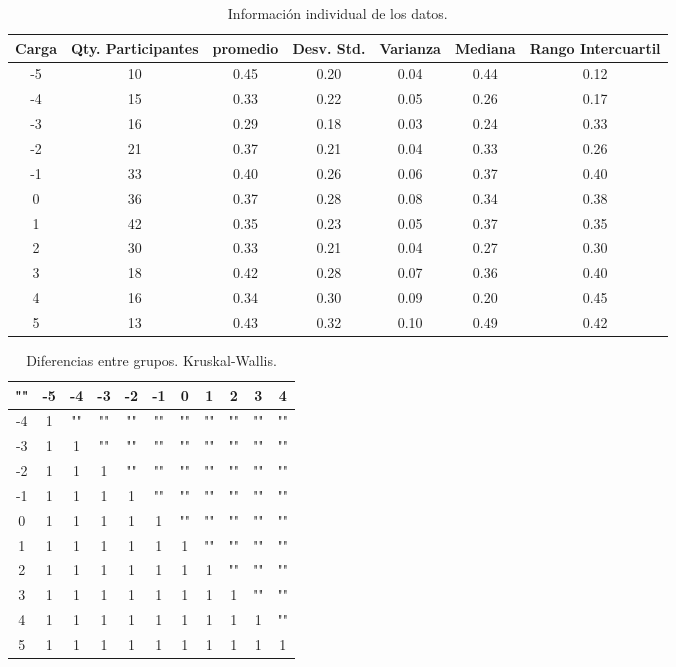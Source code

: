 \documentclass{article}
\begin{document}
\begin{table}[htb]
    \centering
    \caption{Informaci\'on individual de los datos.} 
    \begin{tabular}{|c|c|c|c|c|c|c|}
    \hline
    Carga & Qty. Participantes & promedio & Desv. Std. & Varianza & Mediana & Rango Intercuartil  \\
    \hline
    -5 & 10 & 0.45 & 0.20 & 0.04 & 0.44 & 0.12 \\
    \hline
    -4 & 15 & 0.33 & 0.22 & 0.05 & 0.26 & 0.17 \\
    \hline
    -3 & 16 & 0.29 & 0.18 & 0.03 & 0.24 & 0.33 \\
    \hline
    -2 & 21 & 0.37 & 0.21 & 0.04 & 0.33 & 0.26 \\
    \hline
    -1 & 33 & 0.40 & 0.26 & 0.06 & 0.37 & 0.40 \\
    \hline
    0 & 36 & 0.37 & 0.28 & 0.08 & 0.34 & 0.38 \\
    \hline
    1 & 42 & 0.35 & 0.23 & 0.05 & 0.37 & 0.35 \\
    \hline
    2 & 30 & 0.33 & 0.21 & 0.04 & 0.27 & 0.30 \\
    \hline
    3 & 18 & 0.42 & 0.28 & 0.07 & 0.36 & 0.40 \\
    \hline
    4 & 16 & 0.34 & 0.30 & 0.09 & 0.20 & 0.45 \\
    \hline
    5 & 13 & 0.43 & 0.32 & 0.10 & 0.49 & 0.42 \\
    \hline
\end{tabular}
    \label{cuadro 2}
\end{table}
\newpage

\begin{table}[htb]
    \centering
    \caption{Diferencias entre grupos. Kruskal-Wallis.} 
    \begin{tabular}{|c|c|c|c|c|c|c|c|c|c|c|}
    \hline
    "" & -5 & -4 & -3 & -2 & -1 & 0 & 1 & 2 & 3 & 4 \\
    \hline
    -4 & 1 & "" & "" & "" & "" & "" & "" & "" & "" & "" \\
    \hline
    -3 & 1 & 1 & "" & "" & "" & "" & "" & "" & "" & "" \\
    \hline
    -2 & 1 & 1 & 1 & "" & "" & "" & "" & "" & "" & "" \\
    \hline
    -1 & 1 & 1 & 1 & 1 & "" & "" & "" & "" & "" & "" \\
    \hline
    0 & 1 & 1 & 1 & 1 & 1 & "" & "" & "" & "" & "" \\
    \hline
    1 & 1 & 1 & 1 & 1 & 1 & 1 & "" & "" & "" & "" \\
    \hline
    2 & 1 & 1 & 1 & 1 & 1 & 1 & 1 & "" & "" & "" \\
    \hline
    3 & 1 & 1 & 1 & 1 & 1 & 1 & 1 & 1 & "" & "" \\
    \hline
    4 & 1 & 1 & 1 & 1 & 1 & 1 & 1 & 1 & 1 & "" \\
    \hline
    5 & 1 & 1 & 1 & 1 & 1 & 1 & 1 & 1 & 1 & 1 \\
    \hline
\end{tabular}
    \label{cuadro 3}
\end{table}
\end{document}
